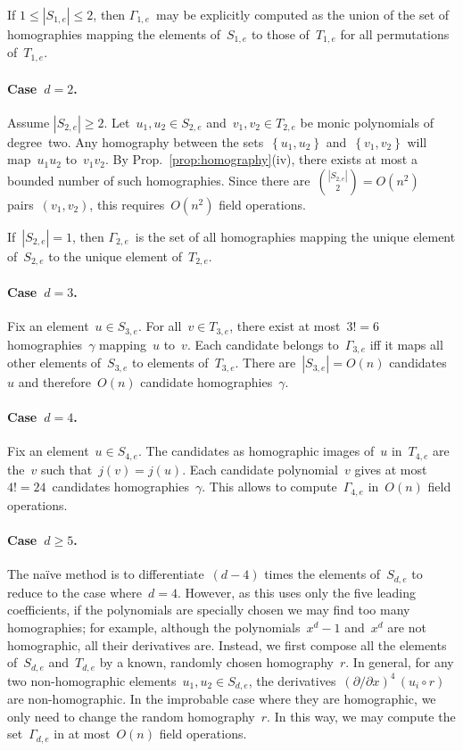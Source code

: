 \documentclass{lms}
\def\acco#1{\left\{#1\right\}}
\def\abs#1{\left|#1\right|}
\def\card#1{\abs{#1}}
\begin{document}
If $1 ≤ \card{S_{1,e}} ≤ 2$, then $Γ_{1,e}$~may be explicitly computed as
the union of the set of homographies mapping the elements of~$S_{1,e}$ to
those of~$T_{1,e}$ for all permutations of~$T_{1,e}$.

\paragraph{Case~$d = 2$.}
Assume $\card{S_{2,e}} ≥ 2$. Let~$u_1, u_2 ∈ S_{2,e}$ and~$v_1, v_2 ∈
T_{2,e}$ be monic polynomials of degree~two. Any homography between the
sets~$\acco{u_1, u_2}$ and~$\acco{v_1, v_2}$ will map~$u_1 u_2$ to~$v_1
v_2$. By Prop.~\ref{prop:homography}(iv), there exists at most a bounded
number of such homographies. Since there are~$\binom{\card{S_{2,e}}}{2} =
O(n^2)$ pairs~$(v_1, v_2)$, this requires~$O(n^2)$ field operations.

If~$\card{S_{2,e}} = 1$, then $Γ_{2,e}$~is the set of all homographies
mapping the unique element of~$S_{2,e}$ to the unique element
of~$T_{2,e}$.

\paragraph{Case~$d = 3$.}
Fix an element~$u ∈ S_{3,e}$. For all~$v ∈ T_{3,e}$, there exist at
most~$3! = 6$ homographies~$γ$ mapping~$u$ to~$v$. Each candidate belongs
to~$Γ_{3,e}$ iff it maps all other elements of~$S_{3,e}$ to elements
of~$T_{3,e}$. There are~$\card{S_{3,e}} = O(n)$ candidates~$u$ and
therefore~$O(n)$ candidate homographies~$γ$.

\paragraph{Case~$d = 4$.}
Fix an element~$u ∈ S_{4,e}$. The candidates as homographic images of~$u$
in~$T_{4,e}$ are the~$v$ such that~$j(v) = j(u)$. Each candidate
polynomial~$v$ gives at most $4! = 24$~candidates homographies~$γ$. This
allows to compute~$Γ_{4,e}$ in~$O(n)$ field operations.

\paragraph{Case~$d ≥ 5$.} The naïve method is to differentiate~$(d-4)$
times the elements of~$S_{d,e}$ to reduce to the case where~$d = 4$.
However, as this uses only the five leading coefficients, if the
polynomials are specially chosen we may find too many homographies; for
example, although the polynomials~$x^d-1$ and~$x^d$ are not homographic,
all their derivatives are. Instead, we first compose all the elements
of~$S_{d,e}$ and~$T_{d,e}$ by a known, randomly chosen homography~$r$. In
general, for any two non-homographic elements~$u_1, u_2 ∈ S_{d,e}$, the
derivatives~$(∂/∂x)^4\, (u_i ∘ r)$ are non-homographic. In the improbable
case where they are homographic, we only need to change the random
homography~$r$. In this way, we may compute the set~$Γ_{d,e}$ in at
most~$O(n)$ field operations.
\end{document}
